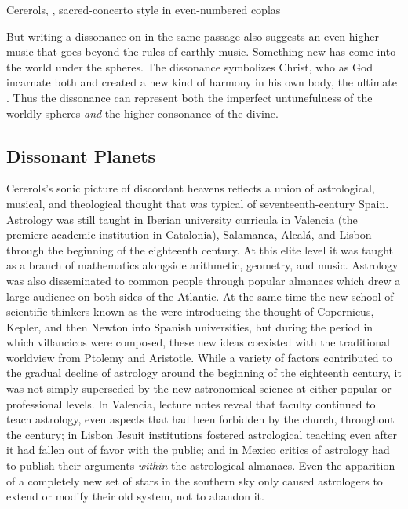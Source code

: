 {Cererols, , sacred-concerto style in even-numbered
coplas}

But writing a dissonance on  in the same passage also
suggests an even higher music that goes beyond the rules of earthly music.
Something new has come into the world under the spheres.
The dissonance symbolizes Christ, who as God incarnate both  and created a new kind of harmony in his own
body, the ultimate .
Thus the dissonance can represent both the imperfect untunefulness of
the worldly spheres \emph{and} the higher consonance of the divine.

\subsection{Dissonant Planets}

Cererols's sonic picture of discordant heavens reflects a union of
astrological, musical, and theological thought that was typical of
seventeenth-century Spain.
Astrology was still taught in Iberian university curricula in Valencia (the
premiere academic institution in Catalonia), Salamanca, Alcalá, and Lisbon
through the beginning of the eighteenth century.%
    \Autocites
    {Lanuza:Astrology-Valencia}
    {Nieto-Galan:History-Science-Spain}
At this elite level it was taught as a branch of mathematics alongside
arithmetic, geometry, and music.
Astrology was also disseminated to common people through popular almanacs
which drew a large audience on both sides of the Atlantic.%
    \Autocite
    {Kassell:History-Astrology}
At the same time the new school of scientific thinkers known as the
 were introducing the thought of Copernicus, Kepler, and then
Newton into Spanish universities, but during the period in which
 villancicos were composed, these new ideas coexisted
with the traditional worldview from Ptolemy and Aristotle.
While a variety of factors contributed to the gradual decline of astrology
around the beginning of the eighteenth century, it was not simply superseded by
the new astronomical science at either popular or professional levels.
In Valencia, lecture notes reveal that faculty continued to teach astrology,
even aspects that had been forbidden by the church, throughout the century; in
Lisbon Jesuit institutions fostered astrological teaching even after it had
fallen out of favor with the public; and in Mexico critics of astrology had to
publish their arguments \emph{within} the astrological almanacs.%
    \Autocites
    {Lanuza:Astrology-Valencia}
    {Carolino:Jesuit-Astronomy-Portugal}
    {More:Heretical-Science-Mexico}
Even the apparition of a completely new set of stars in the southern sky
only caused astrologers to extend or modify their old system, not to abandon
it.%
    \Autocites
    {Brosseder:Astrology-Peru-17C}
    {Lanuza:Updating-Astrology}

